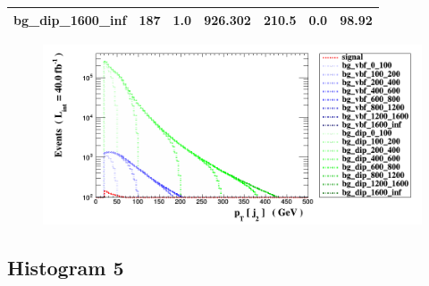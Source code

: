 \documentclass[a4paper, 10pt]{article}
\begin{document}
\begin{table}[H]
\begin{center}
\begin{tabular}{|m{23.0mm}|m{23.0mm}|m{18.0mm}|m{19.0mm}|m{19.0mm}|m{19.0mm}|m{19.0mm}|}
      \hline
      {\cellcolor{white}         bg\_dip\_1600\_inf}& {\cellcolor{white}         187}& {\cellcolor{white}         1.0}& {\cellcolor{white}         926.302}& {\cellcolor{white}         210.5}& {\cellcolor{red}         0.0}& {\cellcolor{red}         98.92}\\
\hline
    \end{tabular}
  \end{center}
\end{table}

\begin{figure}[H]
  \begin{center}
    \includegraphics[scale=0.45]{selection_3.png}\\
\caption{   }
  \end{center}
\end{figure}
      \newpage
\subsection{ Histogram 5}
\end{document}
